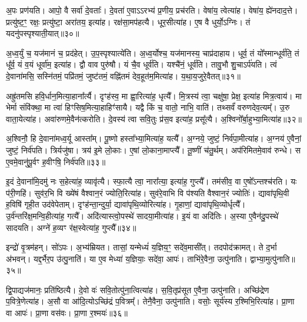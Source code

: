 अ॒पः प्रण॑यति।
आपो॒ वै सर्वा॑ दे॒वताः᳚।
दे॒वता॑ ए॒वाऽऽरभ्य॑ प्र॒णीय॒ प्रच॑रति।
वेषा॑य॒ त्वेत्या॑ह।
वेषा॑य॒ ह्ये॑नदाद॒त्ते।
प्रत्यु॑ष्ट॒ꣳ॒ रक्षः॒ प्रत्यु॑ष्टा॒ अरा॑तय॒ इत्या॑ह।
रक्ष॑सा॒मप॑हत्यै।
धूर॒सीत्या॑ह।
ए॒ष वै धुर्यो॒\-ऽग्निः।
तं यदनु॑पस्पृश्याती॒यात्॥३०॥

अ॒ध्व॒र्युं च॒ यज॑मानं च॒ प्रद॑हेत्।
उ॒प॒स्पृश्यात्ये॑ति।
अ॒ध्व॒र्योश्च॒ यज॑मानस्य॒ चाप्र॑दाहाय।
धूर्व॒ तं यो᳚स्मान्धूर्व॑ति॒ तं धू᳚र्व॒ यं व॒यं धूर्वा॑म॒ इत्या॑ह।
द्वौ वाव पुरु॑षौ।
यं चै॒व धूर्व॑ति।
यश्चै॑नं॒ धूर्व॑ति।
तावु॒भौ शु॒चा\-ऽर्प॑यति।
त्वं दे॒वाना॑मसि॒ सस्नि॑तमं॒ पप्रि॑तमं॒ जुष्ट॑तमं॒ वह्नि॑तमं देव॒हूत॑म॒मित्या॑ह।
य॒था॒\-य॒जु\-रे॒वै\-तत्॥३१॥

अह्रु॑तमसि हवि॒र्धान॒मित्या॒हाना᳚र्त्यै।
दृꣳह॑स्व॒ मा ह्वा॒रित्या॑ह॒ धृत्यै᳚।
मि॒त्रस्य॑ त्वा॒ चक्षु॑षा॒ प्रेक्ष॒ इत्या॑ह मित्र॒त्वाय॑।
मा भेर्मा संवि॑क्था॒ मा त्वा॑ हिꣳसिष॒मित्या॒हाहिꣳ॑सायै।
यद्वै किं च॒ वातो॒ नाभि॒ वाति॑।
तथ्सर्वं॑ वरुणदेव॒त्यम्᳚।
उ॒रु वाता॒येत्या॑ह।
अवा॑रुणमे॒वैन॑त्करोति।
दे॒वस्य॑ त्वा सवि॒तुः प्र॑स॒व इत्या॑ह॒ प्रसू᳚त्यै।
अ॒श्विनो᳚र्बा॒हुभ्या॒मित्या॑ह॥३२॥

अ॒श्विनौ॒ हि दे॒वाना॑मध्व॒र्यू आस्ता᳚म्।
पू॒ष्णो हस्ता᳚भ्या॒मित्या॑ह॒ यत्यै᳚।
अ॒ग्नये॒ जुष्टं॒ निर्व॑पा॒मीत्या॑ह।
अ॒ग्नय॑ ए॒वैनां॒ जुष्टं॒ निर्व॑पति।
त्रिर्यजु॑षा।
त्रय॑ इ॒मे लो॒काः।
ए॒षां लो॒काना॒माप्त्यै᳚।
तू॒ष्णीं च॑तु॒र्थम्।
अप॑रिमितमे॒वाव॑ रुन्धे।
स ए॒वमे॒वानु॑पू॒र्वꣳ ह॒वीꣳषि॒ निर्व॑पति॥३३॥

इ॒दं दे॒वाना॑मि॒दमु॑ नः स॒हेत्या॑ह॒ व्यावृ॑त्यै।
स्फा॒त्यै त्वा॒ नारा᳚त्या॒ इत्या॑ह॒ गुप्त्यै᳚।
तम॑सीव॒ वा ए॒षो᳚\-ऽन्तश्च॑रति।
यः प॑री॒णहि॑।
सुव॑र॒भि वि ख्ये॑षं वैश्वान॒रं ज्योति॒रित्या॑ह।
सुव॑रे॒वाभि वि प॑श्यति वैश्वान॒रं ज्योतिः॑।
द्यावा॑पृथि॒वी ह॒विषि॑ गृही॒त उद॑वेपेताम्।
दृꣳह॑न्ता॒न्दुर्या॒ द्यावा॑पृथि॒व्योरित्या॑ह।
गृ॒हाणां॒ द्यावा॑पृथि॒व्योर्धृत्यै᳚।
उ॒र्व॑न्तरि॑क्ष॒मन्वि॒हीत्या॑ह॒ गत्यै᳚।
अदि॑त्यास्त्वो॒पस्थे॑ सादया॒मीत्या॑ह।
इ॒यं वा अदि॑तिः।
अ॒स्या ए॒वैन॑दु॒पस्थे॑ सादयति।
अग्ने॑ ह॒व्यꣳ र॑क्ष॒स्वेत्या॑ह॒ गुप्त्यै᳚॥३४॥\anuvakamend[य॒ज्ञो वा आपो॒ धाम॑ प्र॒णीय॒ प्रच॑रत्यती॒यादे॒तद्बा॒हुभ्या॒मित्या॑ह ह॒वीꣳषि॒ निर्व॑पति॒ गत्यै॑ च॒त्वारि॑ च]

इन्द्रो॑ वृ॒त्रम॑हन्।
सो॑ऽपः।
अ॒भ्य॑म्रियत।
तासां॒ यन्मेध्यं॑ य॒ज्ञिय॒ꣳ॒ सदे॑व॒मासी᳚त्।
तदपोद॑क्रामत्।
ते द॒र्भा अ॑भवन्।
यद्द॒र्भैर॒प उ॑त्पु॒नाति॑।
या ए॒व मेध्या॑ य॒ज्ञियाः॒ सदे॑वा॒ आपः॑।
ताभि॑रे॒वैना॒ उत्पु॑नाति।
द्वाभ्या॒मुत्पु॑नाति॥३५॥

द्वि॒पाद्यज॑मानः॒ प्रति॑\-ष्ठित्यै।
दे॒वो वः॑ सवि॒तोत्पु॑ना॒त्वित्या॑ह।
स॒वि॒तृप्र॑सूत ए॒वैना॒ उत्पु॑नाति।
अच्छि॑द्रेण प॒वित्रे॒णेत्या॑ह।
अ॒सौ वा आ॑दि॒त्यो\-ऽच्छि॑द्रं प॒वित्रम्᳚।
तेनै॒वैना॒ उत्पु॑नाति।
वसोः॒ सूर्य॑स्य र॒श्मिभि॒रित्या॑ह।
प्रा॒णा वा आपः॑।
प्रा॒णा वस॑वः।
प्रा॒णा र॒श्मयः॑॥३६॥

